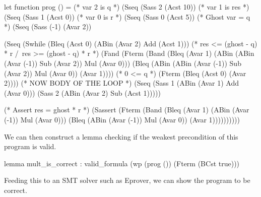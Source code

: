 \begin{lstlistings}[caption={WHILE AST in why3},label={lst:whileast},language=sml]
let function prog () =
  (* var 2 is q *)
  (Sseq (Sass 2 (Acst 10))
  (* var 1 is res *)
  (Sseq (Sass 1 (Acst 0))
  (* var 0 is r *)
  (Sseq (Sass 0 (Acst 5))
  (* Ghost var = q *)
  (Sseq (Sass (-1) (Avar 2))

  (Sseq (Swhile (Bleq (Acst 0) (ABin (Avar 2) Add (Acst 1)))
        (* res <= (ghost - q) * r /\ res >= (ghost - q) * r *)
        (Fand (Fterm (Band (Bleq (Avar 1)  (ABin (ABin (Avar (-1)) Sub (Avar 2)) Mul (Avar 0)))
             (Bleq (ABin (ABin (Avar (-1)) Sub (Avar 2)) Mul (Avar 0)) (Avar 1))))
        (* 0 <= q *)
             (Fterm (Bleq (Acst 0) (Avar 2))))
        (* NOW BODY OF THE LOOP *)
        (Sseq (Sass 1 (ABin (Avar 1) Add (Avar 0)))
              (Sass 2 (ABin (Avar 2) Sub (Acst 1)))))

        (* Assert {res = ghost * r} *)
        (Sassert (Fterm (Band (Bleq (Avar 1) (ABin (Avar (-1)) Mul (Avar 0)))
        (Bleq (ABin (Avar (-1)) Mul (Avar 0)) (Avar 1))))))))))
      \end{lstlistings}

We can then construct a lemma checking if the weakest precondition of this program is valid.

\begin{lstlistings}
lemma mult_is_correct :
   valid_formula (wp (prog ()) (Fterm (BCst true)))
\end{lstlistings}

Feeding this to an SMT solver such as Eprover, we can show the program to be correct.
